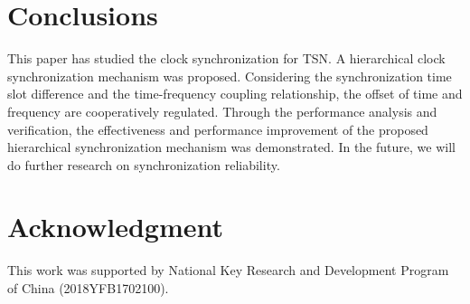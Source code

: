 \documentclass[conference]{IEEEtran}
\begin{document}
\section{Conclusions}
This paper has studied the clock synchronization for TSN. A hierarchical clock synchronization mechanism was proposed. Considering the synchronization time slot difference and the time-frequency coupling relationship, the offset of time and frequency are cooperatively regulated. Through the performance analysis and verification, the effectiveness and performance improvement of the proposed hierarchical synchronization mechanism was demonstrated. In the future, we will do further research on synchronization reliability.

\section*{Acknowledgment}
This work was supported  by National Key Research and Development Program of China (2018YFB1702100).




\end{document}
